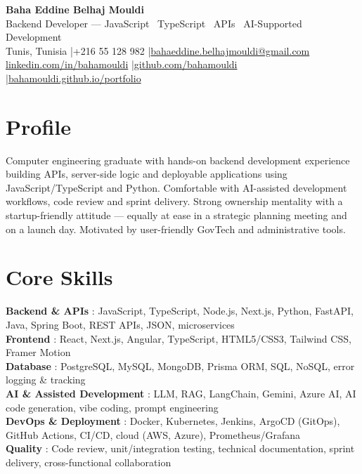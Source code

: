 \documentclass[a4paper,9pt]{article}
\begin{document}
\begin{center}
{\LARGE\bfseries\color{navy} Baha Eddine Belhaj Mouldi}\\[2pt]
{\normalsize\color{navy} Backend Developer --- JavaScript \textbar\ TypeScript \textbar\ APIs \textbar\ AI-Supported Development}\\[3pt]
{\small Tunis, Tunisia \quad|\quad +216 55 128 982 \quad|\quad \href{mailto:bahaeddine.belhajmouldi@gmail.com}{bahaeddine.belhajmouldi@gmail.com}}\\[1pt]
{\small \href{https://www.linkedin.com/in/bahamouldi}{linkedin.com/in/bahamouldi} \quad|\quad \href{https://github.com/bahamouldi}{github.com/bahamouldi} \quad|\quad \href{https://bahamouldi.github.io/portfolio/}{bahamouldi.github.io/portfolio}}
\end{center}
\vspace{1pt}
\section{Profile}
Computer engineering graduate with hands-on backend development experience building APIs, server-side logic and deployable applications using JavaScript/TypeScript and Python. Comfortable with AI-assisted development workflows, code review and sprint delivery. Strong ownership mentality with a startup-friendly attitude --- equally at ease in a strategic planning meeting and on a launch day. Motivated by user-friendly GovTech and administrative tools.
\section{Core Skills}
\textbf{Backend \& APIs} : JavaScript, TypeScript, Node.js, Next.js, Python, FastAPI, Java, Spring Boot, REST APIs, JSON, microservices\\[0.3pt]
\textbf{Frontend} : React, Next.js, Angular, TypeScript, HTML5/CSS3, Tailwind CSS, Framer Motion\\[0.3pt]
\textbf{Database} : PostgreSQL, MySQL, MongoDB, Prisma ORM, SQL, NoSQL, error logging \& tracking\\[0.3pt]
\textbf{AI \& Assisted Development} : LLM, RAG, LangChain, Gemini, Azure AI, AI code generation, vibe coding, prompt engineering\\[0.3pt]
\textbf{DevOps \& Deployment} : Docker, Kubernetes, Jenkins, ArgoCD (GitOps), GitHub Actions, CI/CD, cloud (AWS, Azure), Prometheus/Grafana\\[0.3pt]
\textbf{Quality} : Code review, unit/integration testing, technical documentation, sprint delivery, cross-functional collaboration
\end{document}
